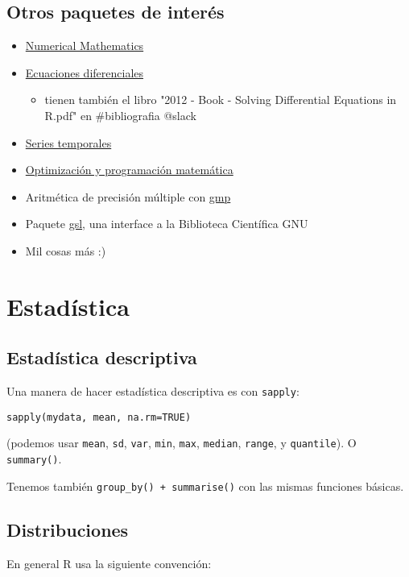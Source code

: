 \documentclass[11pt]{article}
\begin{document}
\subsection*{Otros paquetes de interés}
\label{sec:orgf718d0d}
\begin{itemize}
\item \href{https://cran.r-project.org/web/views/NumericalMathematics.html}{Numerical Mathematics}
\item \href{https://cran.r-project.org/web/views/DifferentialEquations.html}{Ecuaciones diferenciales}
\begin{itemize}
\item tienen también el libro "2012 - Book - Solving Differential Equations in R.pdf" en \#bibliografia @slack
\end{itemize}
\item \href{https://cran.r-project.org/web/views/TimeSeries.html}{Series temporales}
\item \href{https://cran.r-project.org/web/views/Optimization.html}{Optimización y programación matemática}
\item Aritmética de precisión múltiple con \href{https://cran.r-project.org/web/packages/gmp/index.html}{gmp}
\item Paquete \href{https://cran.r-project.org/web/packages/gsl/index.html}{gsl}, una interface a la Biblioteca Científica GNU
\item Mil cosas más :)
\end{itemize}

\section*{Estadística}
\label{sec:orgb4b58a2}
\subsection*{Estadística descriptiva}
\label{sec:org6e1dffb}
Una manera de hacer estadística descriptiva es con \texttt{sapply}:
\begin{verbatim}
sapply(mydata, mean, na.rm=TRUE) 
\end{verbatim}
(podemos usar \texttt{mean}, \texttt{sd}, \texttt{var}, \texttt{min}, \texttt{max}, \texttt{median}, \texttt{range}, y \texttt{quantile}). O \texttt{summary()}.

Tenemos también \texttt{group\_by() + summarise()} con las mismas funciones básicas.
\subsection*{Distribuciones}
\label{sec:orgc7d3c72}
En general R usa la siguiente convención:
\end{document}
